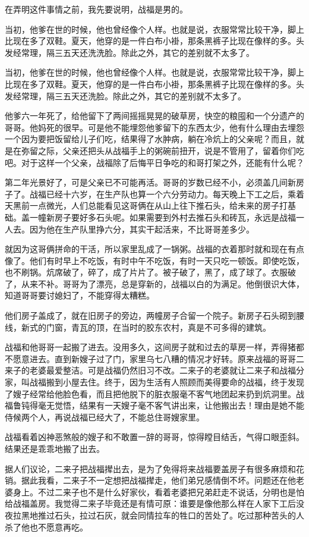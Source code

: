 在弄明这件事情之前，我先要说明，战福是男的。 

当初，他爹在世的时候，他也曾经像个人样。也就是说，衣服常常比较干净，脚上比现在多了双鞋。夏天，他穿的是一件白布小褂，那条黑裤子比现在像样的多。头发经常理，隔三五天还洗洗脸。除此之外，其它的差别就不太多了。 

当初，他爹在世的时候，他也曾经像个人样。也就是说，衣服常常比较干净，脚上比现在多了双鞋。夏天，他穿的是一件白布小褂，那条黑裤子比现在像样的多。头发经常理，隔三五天还洗脸。除此之外，其它的差别就不太多了。 

他爹六一年死了，给他留下了两间摇摇晃晃的破草房，快空的粮囤和一个分遗产的哥哥。他妈死的很早。可是他不能埋怨他爹留下的东西太少，他有什么理由去埋怨一个因为要把饭留给儿子们吃，结果得了水肿病，躺在冷炕上的父亲呢？而且，就是在弥留之际，父亲还把头从战福手上的粥碗前扭开，说是不管用了，留着你们吃吧。对于这样一个父亲，战福除了后悔平日争吃的和哥打架之外，还能有什么呢？ 

第二年光景好了，可是父亲已不可能再活。哥哥的岁数已经不小，必须盖几间新房子了。战福已经十六岁，在生产队也算一个六分劳动力。每天晚上下工之后，乘着天黑前一点微光，人们总能看见这哥俩在从山上往下推石头，给未来的房子打基础。盖一幢新房子要好多石头呢。如果需要到外村去推石头和砖瓦，永远是战福一人去。因为他在生产队里挣六分，其实干起活来，不比哥哥差多少。 

就因为这哥俩拼命的干活，所以家里乱成了一锅粥。战福的衣着那时就和现在有点像了。他们有时早上不吃饭，有时中午不吃饭，有时一天只吃一顿饭。即使吃饭，也不刷锅。炕席破了，碎了，成了片片了。被子破了，黑了，成了球了。衣服破了，从来不补。哥哥为了漂亮，总是穿新的，战福以白的为满足。他倒很识大体，知道哥哥要讨媳妇了，不能穿得太糟糕。 

他们房子盖成了，就在旧房子的旁边，两幢房子合留一个院子。新房子石头砌到腰线，新式的门窗，青瓦的顶，在当时的胶东农村，真是不可多得的建筑。 

战福和他哥哥一起搬了进去。没用多久，这间房子就和过去的草房一样，弄得猪都不愿意进去。直到新嫂子过了门，家里乌七八糟的情况才好转。原来战福的哥哥二来子的老婆最爱整洁。可是战福仍然旧习不改。二来子的老婆就让二来子和战福分家，叫战福搬到小屋去住。终于，因为生活有人照顾而美得要命的战福，终于发现了嫂子经常给他脸色看，而且把他脱下的脏衣服毫不客气地团起来扔到炕洞里。战福鲁钝得毫无觉悟，结果有一天嫂子毫不客气讲出来，让他搬出去！理由是她不能侍候两个人，再说战福已经大了，不能总住哥嫂家里。 

战福看着凶神恶煞般的嫂子和不敢置一辞的哥哥，惊得瞠目结舌，气得口眼歪斜。结果还是乖乖地搬了出去。 

据人们议论，二来子把战福撵出去，是为了免得将来战福要盖房子有很多麻烦和花销。据此我看，二来子不一定想把战福撵走，他们弟兄感情倒不坏。问题还在他老婆身上。不过二来子也不是什么好家伙，看着老婆把兄弟赶走不说话，分明也是怕给战福盖房。我觉得二来子毕竟还是有情可原：谁要是像他那么样在人家下工后没夜拉黑地推过石头，拉过石灰，就会同情拉车的牲口的苦处了。吃过那种苦头的人杀了他也不愿意再吃。 

